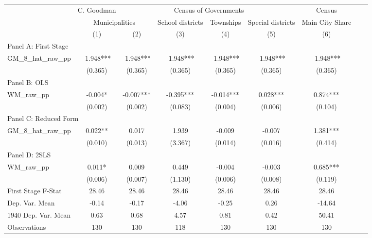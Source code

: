  \begin{tabular}{l*{8}{c}} \toprule
&\multicolumn{1}{c}{C. Goodman}&\multicolumn{4}{c}{Census of Governments}&\multicolumn{1}{c}{Census}\\\cmidrule(lr){2-2}\cmidrule(lr){3-6}\cmidrule(lr){7-7}
&\multicolumn{2}{c}{Municipalities}&\multicolumn{1}{c}{School districts}&\multicolumn{1}{c}{Townships}&\multicolumn{1}{c}{Special districts}&\multicolumn{1}{c}{Main City Share}\\\cmidrule(lr){2-3}\cmidrule(lr){4-6}\cmidrule(lr){7-7}
&\multicolumn{1}{c}{(1)}&\multicolumn{1}{c}{(2)}&\multicolumn{1}{c}{(3)}&\multicolumn{1}{c}{(4)}&\multicolumn{1}{c}{(5)}&\multicolumn{1}{c}{(6)}\\
\cmidrule(lr){1-7}
\multicolumn{6}{l}{Panel A: First Stage}\\
\cmidrule(lr){1-7}
GM\_8\_hat\_raw\_pp &   -1.948***&   -1.948***&   -1.948***&   -1.948***&   -1.948***&   -1.948***\\
                &  (0.365)   &  (0.365)   &  (0.365)   &  (0.365)   &  (0.365)   &  (0.365)   \\
\cmidrule(lr){1-7}
\multicolumn{6}{l}{Panel B: OLS}\\
\cmidrule(lr){1-7}
WM\_raw\_pp       &   -0.004*  &   -0.007***&   -0.395***&   -0.014***&    0.028***&    0.874***\\
                &  (0.002)   &  (0.002)   &  (0.083)   &  (0.004)   &  (0.006)   &  (0.104)   \\
\cmidrule(lr){1-7}
\multicolumn{6}{l}{Panel C: Reduced Form}\\
\cmidrule(lr){1-7}
GM\_8\_hat\_raw\_pp &    0.022** &    0.017   &    1.939   &   -0.009   &   -0.007   &    1.381***\\
                &  (0.010)   &  (0.013)   &  (3.367)   &  (0.014)   &  (0.016)   &  (0.414)   \\
\cmidrule(lr){1-7}
\multicolumn{6}{l}{Panel D: 2SLS}\\
\cmidrule(lr){1-7}
WM\_raw\_pp       &    0.011*  &    0.009   &    0.449   &   -0.004   &   -0.003   &    0.685***\\
                &  (0.006)   &  (0.007)   &  (1.130)   &  (0.006)   &  (0.008)   &  (0.119)   \\
\midrule
First Stage F-Stat&    28.46   &    28.46   &    28.46   &    28.46   &    28.46   &    28.46   \\
Dep. Var. Mean  &    -0.14   &    -0.17   &    -4.06   &    -0.25   &     0.26   &   -14.64   \\
1940 Dep. Var. Mean&     0.63   &     0.68   &     4.57   &     0.81   &     0.42   &    50.41   \\
Observations    &      130   &      130   &      118   &      130   &      130   &      130   \\
 \bottomrule \end{tabular}
